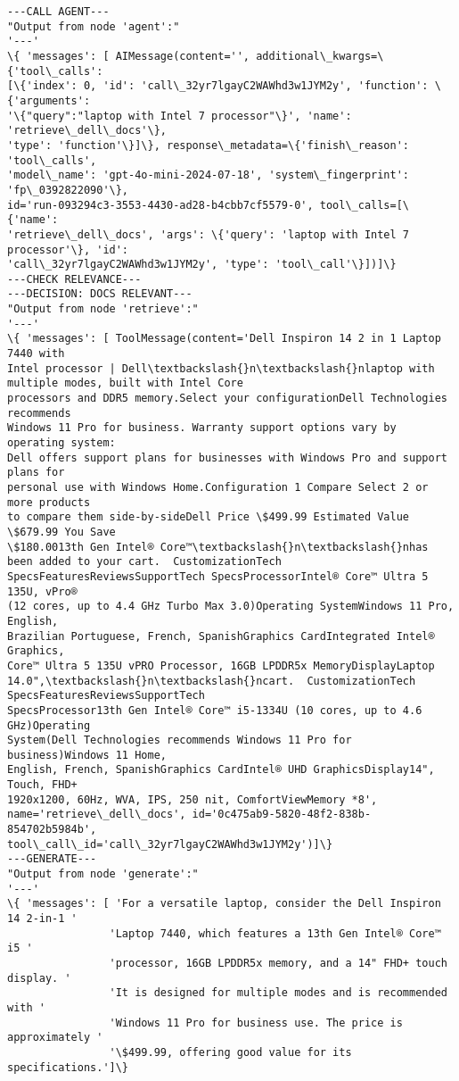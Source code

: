\documentclass[11pt]{article}
\begin{document}
    \begin{Verbatim}[commandchars=\\\{\}]
---CALL AGENT---
"Output from node 'agent':"
'---'
\{ 'messages': [ AIMessage(content='', additional\_kwargs=\{'tool\_calls':
[\{'index': 0, 'id': 'call\_32yr7lgayC2WAWhd3w1JYM2y', 'function': \{'arguments':
'\{"query":"laptop with Intel 7 processor"\}', 'name': 'retrieve\_dell\_docs'\},
'type': 'function'\}]\}, response\_metadata=\{'finish\_reason': 'tool\_calls',
'model\_name': 'gpt-4o-mini-2024-07-18', 'system\_fingerprint': 'fp\_0392822090'\},
id='run-093294c3-3553-4430-ad28-b4cbb7cf5579-0', tool\_calls=[\{'name':
'retrieve\_dell\_docs', 'args': \{'query': 'laptop with Intel 7 processor'\}, 'id':
'call\_32yr7lgayC2WAWhd3w1JYM2y', 'type': 'tool\_call'\}])]\}
---CHECK RELEVANCE---
---DECISION: DOCS RELEVANT---
"Output from node 'retrieve':"
'---'
\{ 'messages': [ ToolMessage(content='Dell Inspiron 14 2 in 1 Laptop 7440 with
Intel processor | Dell\textbackslash{}n\textbackslash{}nlaptop with multiple modes, built with Intel Core
processors and DDR5 memory.Select your configurationDell Technologies recommends
Windows 11 Pro for business. Warranty support options vary by operating system:
Dell offers support plans for businesses with Windows Pro and support plans for
personal use with Windows Home.Configuration 1 Compare Select 2 or more products
to compare them side-by-sideDell Price \$499.99 Estimated Value  \$679.99 You Save
\$180.0013th Gen Intel® Core™\textbackslash{}n\textbackslash{}nhas been added to your cart.  CustomizationTech
SpecsFeaturesReviewsSupportTech SpecsProcessorIntel® Core™ Ultra 5 135U, vPro®
(12 cores, up to 4.4 GHz Turbo Max 3.0)Operating SystemWindows 11 Pro, English,
Brazilian Portuguese, French, SpanishGraphics CardIntegrated Intel® Graphics,
Core™ Ultra 5 135U vPRO Processor, 16GB LPDDR5x MemoryDisplayLaptop
14.0",\textbackslash{}n\textbackslash{}ncart.  CustomizationTech SpecsFeaturesReviewsSupportTech
SpecsProcessor13th Gen Intel® Core™ i5-1334U (10 cores, up to 4.6 GHz)Operating
System(Dell Technologies recommends Windows 11 Pro for business)Windows 11 Home,
English, French, SpanishGraphics CardIntel® UHD GraphicsDisplay14", Touch, FHD+
1920x1200, 60Hz, WVA, IPS, 250 nit, ComfortViewMemory *8',
name='retrieve\_dell\_docs', id='0c475ab9-5820-48f2-838b-854702b5984b',
tool\_call\_id='call\_32yr7lgayC2WAWhd3w1JYM2y')]\}
---GENERATE---
"Output from node 'generate':"
'---'
\{ 'messages': [ 'For a versatile laptop, consider the Dell Inspiron 14 2-in-1 '
                'Laptop 7440, which features a 13th Gen Intel® Core™ i5 '
                'processor, 16GB LPDDR5x memory, and a 14" FHD+ touch display. '
                'It is designed for multiple modes and is recommended with '
                'Windows 11 Pro for business use. The price is approximately '
                '\$499.99, offering good value for its specifications.']\}
    \end{Verbatim}


    
    
    
\end{document}
